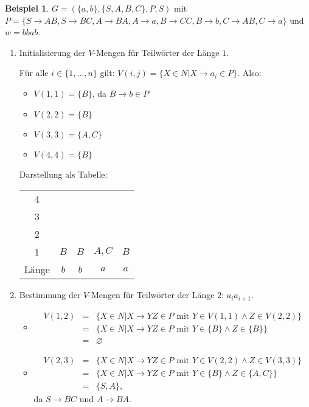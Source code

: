 \documentclass[11pt]{article} %
\theoremstyle{definition}
\newtheorem*{beispiel}{Beispiel}
\begin{document}
\begin{beispiel}
$G = (\{a,b\}, \{S,A,B,C\}, P, S)$ mit $P = \{S \rightarrow AB, S \rightarrow BC, A \rightarrow BA, A \rightarrow a, B \rightarrow CC, B \rightarrow b, C \rightarrow AB, C \rightarrow a \}$ und $w = bbab$.

\begin{enumerate}
\item Initialisierung der $V$-Mengen für Teilwörter der Länge $1$.

Für alle $i \in \{1,\dots, n\}$ gilt: $V(i, j) = \{X \in N | X \rightarrow a_i \in P\}$. Also:
\begin{itemize}
\item $V(1,1) = \{ B \}$, da $B\rightarrow b \in P$
\item $V(2,2) = \{ B \}$
\item $V(3,3) = \{ A, C \}$
\item $V(4,4) = \{ B \}$
\end{itemize}

Darstellung als Tabelle:

\begin{center}
\begin{tabular}{ccccc}
\toprule
4     &       &       &       &  \\
3     &       &       &       &  \\
2     &       &       &       &  \\
1     & $B$     & $B$     & $A,C$   & $B$ \\
\midrule
Länge & $b$     & $b$     & $a$     & $a$ \\
\bottomrule
\end{tabular}%
\end{center}

\item Bestimmung der $V$-Mengen für Teilwörter der Länge $2$: $a_ia_{i+1}$.
\begin{itemize}
\item \begin{eqnarray*}
V(1,2) &=& \{ X \in N | X \rightarrow YZ \in P \textrm{ mit } Y \in V(1,1) \land Z \in V(2,2) \} \\
&=& \{ X \in N | X \rightarrow YZ \in P \textrm{ mit } Y \in \{B\} \land Z \in \{B\} \} \\
&=& \varnothing
\end{eqnarray*}

\item \begin{eqnarray*}
V(2,3) &=& \{ X \in N | X \rightarrow YZ \in P \textrm{ mit } Y \in V(2,2) \land Z \in V(3,3) \} \\
&=& \{ X \in N | X \rightarrow YZ \in P \textrm{ mit } Y \in \{B\} \land Z \in \{A,C\} \} \\
&=& \{S,A\},
\end{eqnarray*}
da $S \rightarrow BC$ und $A\rightarrow BA$.


\end{itemize}
\end{enumerate}
\end{beispiel}
\end{document}
